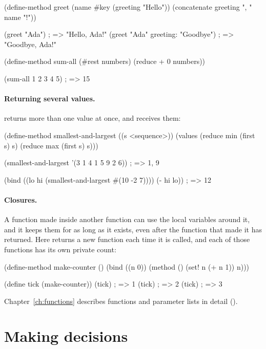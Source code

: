 \begin{dylan}
(define-method greet (name #key (greeting "Hello"))
  (concatenate greeting ", " name "!"))

(greet "Ada")                       ; => "Hello, Ada!"
(greet "Ada" greeting: "Goodbye")   ; => "Goodbye, Ada!"

(define-method sum-all (#rest numbers)
  (reduce + 0 numbers))

(sum-all 1 2 3 4 5)                 ; => 15
\end{dylan}

\paragraph{Returning several values.}
 returns more than one value at once, and 
receives them:

\begin{dylan}
(define-method smallest-and-largest ((s <sequence>))
  (values (reduce min (first s) s)
          (reduce max (first s) s)))

(smallest-and-largest '(3 1 4 1 5 9 2 6))   ; => 1, 9

(bind ((lo hi (smallest-and-largest #(10 -2 7))))
  (- hi lo))                                ; => 12
\end{dylan}

\paragraph{Closures.}
A function made inside another function can use the local variables
around it, and it keeps them for as long as it exists, even after the
function that made it has returned. Here  returns a new
function each time it is called, and each of those functions has its own
private count:

\begin{dylan}
(define-method make-counter ()
  (bind ((n 0))
    (method ()
      (set! n (+ n 1))
      n)))

(define tick (make-counter))
(tick)                          ; => 1
(tick)                          ; => 2
(tick)                          ; => 3
\end{dylan}

Chapter~\ref{ch:functions} describes functions and parameter lists in
detail ().

\section{Making decisions}\label{sec:tut-conditionals}

